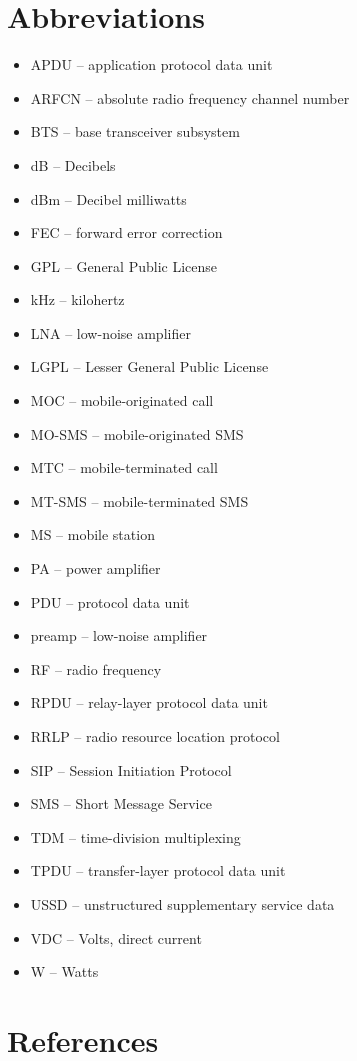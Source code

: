 \documentclass[11pt,openany]{book}
\begin{document}
\section{Abbreviations}
\begin{itemize}
	\item APDU -- application protocol data unit
	\item ARFCN -- absolute radio frequency channel number
	\item BTS -- base transceiver subsystem
	\item dB -- Decibels
	\item dBm -- Decibel milliwatts
	\item FEC -- forward error correction
	\item GPL -- General Public License
	\item kHz -- kilohertz
	\item LNA -- low-noise amplifier
	\item LGPL -- Lesser General Public License
	\item MOC -- mobile-originated call
	\item MO-SMS -- mobile-originated SMS
	\item MTC -- mobile-terminated call
	\item MT-SMS -- mobile-terminated SMS
	\item MS -- mobile station
	\item PA -- power amplifier
	\item PDU -- protocol data unit
	\item preamp -- low-noise amplifier
	\item RF -- radio frequency
	\item RPDU -- relay-layer protocol data unit
	\item RRLP -- radio resource location protocol
	\item SIP -- Session Initiation Protocol
	\item SMS -- Short Message Service
	\item TDM -- time-division multiplexing
	\item TPDU -- transfer-layer protocol data unit
	\item USSD -- unstructured supplementary service data
	\item VDC -- Volts, direct current
	\item W -- Watts
\end{itemize}


\section{References}
\end{document}
